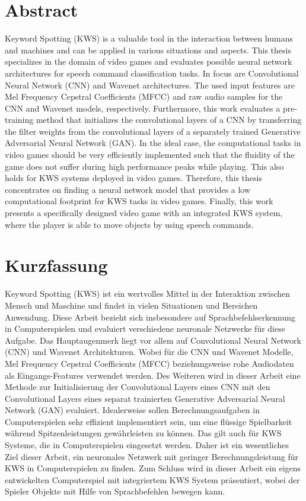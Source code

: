 
\chapter*{Abstract}\label{sec:shards_abstract}
Keyword Spotting (KWS) is a valuable tool in the interaction between humans and machines and can be applied in various situations and aspects.
This thesis specializes in the domain of video games and evaluates possible neural network architectures for speech command classification tasks.
In focus are Convolutional Neural Network (CNN) and Wavenet architectures.
The used input features are Mel Frequency Cepstral Coefficients (MFCC) and raw audio samples for the CNN and Wavenet models, respectively.
Furthermore, this work evaluates a pre-training method that initializes the convolutional layers of a CNN by transferring the filter weights from the convolutional layers of a separately trained Generative Adversarial Neural Network (GAN).
In the ideal case, the computational tasks in video games should be very efficiently implemented such that the fluidity of the game does not suffer during high performance peaks while playing.
This also holds for KWS systems deployed in video games.
Therefore, this thesis concentrates on finding a neural network model that provides a low computational footprint for KWS tasks in video games.
Finally, this work presents a specifically designed video game with an integrated KWS system, where the player is able to move objects by using speech commands.



\chapter*{Kurzfassung}
Keyword Spotting (KWS) ist ein wertvolles Mittel in der Interaktion zwischen Mensch und Maschine und findet in vielen Situationen und Bereichen Anwendung.
Diese Arbeit bezieht sich insbesondere auf Sprachbefehlserkennung in Computerspielen und evaluiert verschiedene neuronale Netzwerke für diese Aufgabe.
Das Hauptaugenmerk liegt vor allem auf Convolutional Neural Network (CNN) und Wavenet Architekturen.
Wobei für die CNN und Wavenet Modelle, Mel Frequency Cepstral Coefficients (MFCC) beziehungsweise rohe Audiodaten als Eingangs-Features verwendet werden.
Des Weiteren wird in dieser Arbeit eine Methode zur Initialisierung der Convolutional Layers eines CNN mit den Convolutional Layers eines separat trainierten Generative Adversarial Neural Network (GAN) evaluiert.
Idealerweise sollen Berechnungsaufgaben in Computerspielen sehr effizient implementiert sein, um eine flüssige Spielbarkeit während Spitzenleistungen gewährleisten zu können.
Das gilt auch für KWS Systeme, die in Computerspielen eingesetzt werden.
Daher ist ein wesentliches Ziel dieser Arbeit, ein neuronales Netzwerk mit geringer Berechnungsleistung für KWS in Computerspielen zu finden.
Zum Schluss wird in dieser Arbeit ein eigens entwickelten Computerspiel mit integriertem KWS System präsentiert, wobei der Spieler Objekte mit Hilfe von Sprachbefehlen bewegen kann.